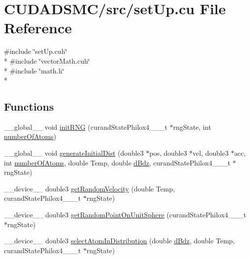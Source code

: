 \hypertarget{set_up_8cu}{\section{C\+U\+D\+A\+D\+S\+M\+C/src/set\+Up.cu File Reference}
\label{set_up_8cu}
}
{\ttfamily \#include \char`\"{}set\+Up.\+cuh\char`\"{}}\\*
{\ttfamily \#include \char`\"{}vector\+Math.\+cuh\char`\"{}}\\*
{\ttfamily \#include \char`\"{}math.\+h\char`\"{}}\\*
\subsection*{Functions}
\begin{DoxyCompactItemize}
\item 
\+\_\+\+\_\+global\+\_\+\+\_\+ void \hyperlink{set_up_8cu_a59b2f493671738afe527c78b5403abc6}{init\+R\+N\+G} (curand\+State\+Philox4\+\_\+\_\+\_\+t $\ast$rng\+State, int \hyperlink{initial_system_parameters_8cuh_a5ce690e43012981ef3034cbf0c746489}{number\+Of\+Atoms})
\item 
\+\_\+\+\_\+global\+\_\+\+\_\+ void \hyperlink{set_up_8cu_a2270711d34c72488e0e0bf52daaeee4b}{generate\+Initial\+Dist} (double3 $\ast$pos, double3 $\ast$vel, double3 $\ast$acc, int \hyperlink{initial_system_parameters_8cuh_a5ce690e43012981ef3034cbf0c746489}{number\+Of\+Atoms}, double Temp, double \hyperlink{initial_system_parameters_8cuh_a25fc2a358206c74d3dfd41c48d05bb9d}{d\+Bdz}, curand\+State\+Philox4\+\_\+\_\+\_\+t $\ast$rng\+State)
\item 
\+\_\+\+\_\+device\+\_\+\+\_\+ double3 \hyperlink{set_up_8cu_a0ffd35e69bde34e9f1c41797f7382f5e}{get\+Random\+Velocity} (double Temp, curand\+State\+Philox4\+\_\+\_\+\_\+t $\ast$rng\+State)
\item 
\+\_\+\+\_\+device\+\_\+\+\_\+ double3 \hyperlink{set_up_8cu_a47d515269c13a8396d1fb013d5843c0b}{get\+Random\+Point\+On\+Unit\+Sphere} (curand\+State\+Philox4\+\_\+\_\+\_\+t $\ast$rng\+State)
\item 
\+\_\+\+\_\+device\+\_\+\+\_\+ double3 \hyperlink{set_up_8cu_ae4b8b56540614cdfa269005ac68c1bff}{select\+Atom\+In\+Distribution} (double \hyperlink{initial_system_parameters_8cuh_a25fc2a358206c74d3dfd41c48d05bb9d}{d\+Bdz}, double Temp, curand\+State\+Philox4\+\_\+\_\+\_\+t $\ast$rng\+State)
\item 

\end{DoxyCompactItemize}
